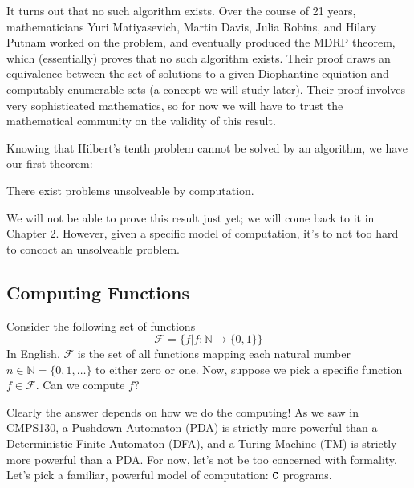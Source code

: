\documentclass[english, 12pt]{article}
\begin{document}
  It turns out that no such algorithm exists. Over the course of 21 years,
  mathematicians Yuri Matiyasevich, Martin Davis, Julia Robins, and Hilary
  Putnam worked on the problem, and eventually produced the MDRP theorem,
  which (essentially) proves that no such algorithm exists. Their proof 
  draws an equivalence between the set of solutions to a given Diophantine
  equiation and computably enumerable sets (a concept we will study later).
  Their proof involves very sophisticated mathematics, so for now we will
  have to trust the mathematical community on the validity of this result.
  \n

  Knowing that Hilbert's tenth problem cannot be solved by an algorithm,
  we have our first theorem:
  \begin{thrm}
      There exist problems unsolveable by computation.
  \end{thrm}
  We will not be able to prove this result just yet; we will come back to
  it in Chapter 2. However, given a specific model of computation, it's to
  not too hard to concoct an unsolveable problem.
  \subsection{Computing Functions}
  Consider the following set of functions
  \[ \mathcal{F} = \{ f | f : \mathbb{N} \rightarrow \{0,1\} \} \]
  In English, $\mathcal{F}$ is the set of all functions mapping each natural
  number \(n \in \mathbb{N} = \{0, 1, \dots \} \) to either zero or one.
  Now, suppose we pick a specific function $f \in \mathcal{F}$. Can we
  compute $f$? \n

  Clearly the answer depends on how we do the computing! As we saw in
  CMPS130, a Pushdown Automaton (PDA) is strictly more powerful than a
  Deterministic Finite Automaton (DFA), and a Turing Machine (TM) is
  strictly more powerful than a PDA. For now, let's not be too concerned
  with formality. Let's pick a familiar, powerful model of computation:
  ${\texttt{C}}$ programs. \n
\end{document}
